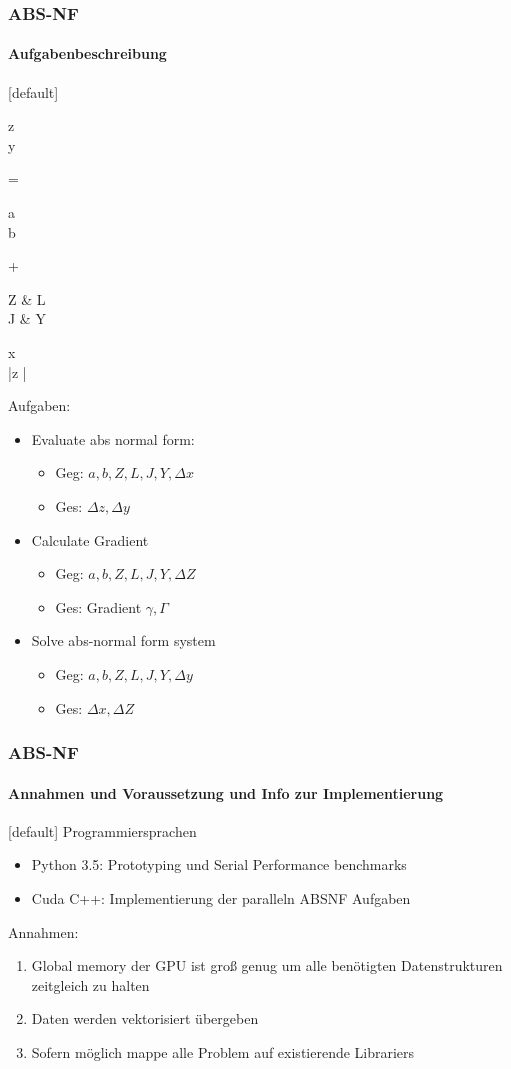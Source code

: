 \begin{frame}
	\frametitle{ABS-NF}
	\framesubtitle{Aufgabenbeschreibung}
	[default]
	\begin{flalign*}
	\begin{pmatrix}
	\Delta z \\
	\Delta y
	\end{pmatrix}
	= 
	\begin{pmatrix}
	a \\
	b
	\end{pmatrix}
	+
	\begin{pmatrix}
	Z & L \\
	J & Y 
	\end{pmatrix}
	\times
	\begin{pmatrix}
	\Delta x \\
	|\Delta z |
	\end{pmatrix}
	\end{flalign*}
	Aufgaben:
	\begin{itemize}
		\item <1-> Evaluate abs normal form:
			\begin{itemize}
				\item Geg: $a,b,Z,L,J,Y,\Delta x$
				\item Ges: $\Delta z, \Delta y$
			\end{itemize}
		\item <2-> Calculate Gradient
			\begin{itemize}
				\item Geg: $a,b,Z,L,J,Y, \Delta Z$
				\item Ges: Gradient $\gamma, \Gamma$
			\end{itemize}
		\item <3-> Solve abs-normal form system
		\begin{itemize}
			\item Geg: $a,b,Z,L,J,Y,\Delta y$
			\item Ges: $\Delta x, \Delta Z$
		\end{itemize}
	\end{itemize}
\end{frame}
\begin{frame}
	\frametitle{ABS-NF}
	\framesubtitle{Annahmen und Voraussetzung und Info zur Implementierung}
	[default]
	Programmiersprachen
	\begin{itemize}
		\item Python 3.5: Prototyping und Serial Performance benchmarks
		\item Cuda C++: Implementierung der paralleln ABSNF Aufgaben
	\end{itemize}
	
	Annahmen:
	\begin{enumerate}
		\item Global memory der GPU ist groß genug um alle benötigten Datenstrukturen zeitgleich zu halten
		\item Daten werden vektorisiert übergeben
		\item Sofern möglich mappe alle Problem auf existierende Librariers
	\end{enumerate}
	
\end{frame}
